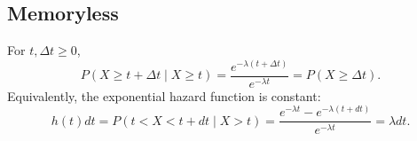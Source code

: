 \documentclass{article}
\begin{document}
 \subsection{Memoryless}
 For $t, \Delta t \geq 0$, 
 \begin{equation*}
 P(X \geq t + \Delta t \mid X \geq t) = \frac{e^{-\lambda (t + \Delta t)}}{e^{-\lambda t}} = P(X \geq \Delta t).
 \end{equation*}
Equivalently, the exponential hazard function is constant:
 \begin{equation*}
 h(t) dt = P(t < X < t + dt \mid X > t) = \frac{e^{-\lambda t} - e^{-\lambda (t+dt)}}{e^{-\lambda t}}  = \lambda dt .
 \end{equation*}
 
 	
 
 
\end{document}
